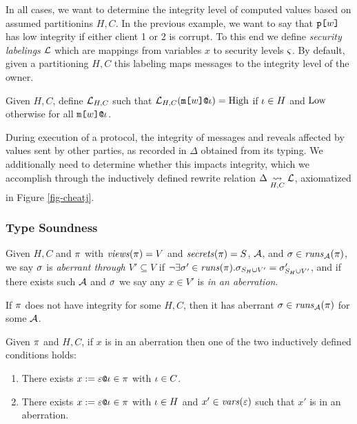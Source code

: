In all cases, we want to determine the integrity level of computed
values based on assumed partitionins $H,C$. In the previous example,
we want to say that $\texttt{p[}w\texttt{]}$ has low integrity if either client 1 or
2 is corrupt.  To this end we define \emph{security labelings}
$\mathcal{L}$ which are mappings from variables $x$ to security levels
$\varsigma$. By default, given a partitioning $H,C$ this labeling maps
messages to the integrity level of the owner.
\begin{definition}  
  Given $H,C$,
  define $\mathcal{L}_{H,C}$ such that $\mathcal{L}_{H,C}(\texttt{m[}w\texttt{]}\texttt{@}\iota ) = \mathrm{High}$
  if $\iota \in H$  and $\mathrm{Low}$
  otherwise for all $\texttt{m[}w\texttt{]}\texttt{@}\iota$.
\end{definition}
During execution of a protocol, the integrity of messages and reveals
affected by values sent by other parties, as recorded in $\Delta$
obtained from its typing. We additionally need to determine
whether this impacts integrity, which we accomplish through
the inductively defined rewrite relation $\Delta \underset{H,C}{\leadsto} \mathcal{L}$,
axiomatized in Figure \ref{fig-cheatj}.

\subsubsection{Type Soundness}

\begin{definition}
  Given $H,C$ and $\pi$ with $\mathit{views}(\pi) = V$ and $\mathit{secrets}(\pi) = S$,
  $\mathcal{A}$, and $\sigma \in \mathit{runs}_{\mathcal{A}}(\pi)$, we say $\sigma$ is
  \emph{aberrant through $V' \subseteq V$} if $\neg\exists \sigma' \in \mathit{runs}(\pi) .
  \sigma_{S_H \cup V'} = \sigma'_{S_H \cup V'}$, and if there exists
  such $\mathcal{A}$ and $\sigma$ we say any
  $x \in V'$ is \emph{in an aberration}.
\end{definition}

\begin{lemma}
  If $\pi$ does not have integrity for some $H,C$, then it has
  aberrant $\sigma \in \mathit{runs}_{\mathcal{A}}(\pi)$ for some $\mathcal{A}$. 
\end{lemma}

\begin{lemma}
  Given $\pi$ and $H,C$, if $x$ is in an aberration then one of
  the two inductively defined conditions holds:
  \begin{enumerate}[\hspace{5mm}i.]
  \item There exists $x := \varepsilon\texttt{@}\iota \in \pi$ with $\iota \in C$.
  \item There exists $x := \varepsilon\texttt{@}\iota \in \pi$ with $\iota \in H$ and
    $x' \in \mathit{vars}(\varepsilon)$ such that $x'$ is in an aberration.
  \end{enumerate}
\end{lemma}

